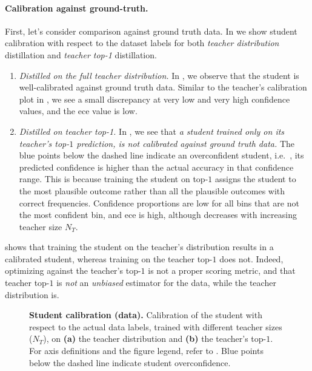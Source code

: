 \paragraph{Calibration against ground-truth.}
First, let's consider comparison against ground truth data.
In  we show  student calibration with respect to the dataset labels
for both \emph{teacher distribution} distillation and \emph{teacher top-1} distillation.
\begin{enumerate}
  \item \emph{Distilled on the full teacher distribution.} In , we observe that the student is well-calibrated against ground truth data. Similar to the teacher's calibration plot in , we see a small discrepancy at very low and very high confidence values, and the \gls{ece} value is low.
  \item \emph{Distilled on teacher top-1.} In , we see that \emph{a student trained only on its teacher's top-$1$ prediction, 
  is not calibrated against ground truth data.} 
  The blue points below the dashed line indicate an overconfident student, i.e.~, its predicted confidence is higher than the actual accuracy in that confidence range. 
  This is because training the student on top-$1$ assigns the student to the most plausible outcome rather than all the plausible outcomes with correct frequencies. 
  Confidence proportions are low for all bins that are not the most confident bin, and \gls{ece} is high, although decreases with increasing teacher size $N_T$.
\end{enumerate}
 shows that training the student on the teacher's distribution results in a calibrated student, whereas training on the teacher top-$1$
does not.
Indeed, optimizing against the teacher's top-$1$ is not a proper scoring metric, and that teacher top-$1$ is \emph{not} an \emph{unbiased} estimator for the data, while the teacher distribution is.
\begin{figure}[h]
  \centering
  \hfill
  \caption{\textbf{Student calibration (data).} Calibration of the student with respect to the actual data labels, trained with different teacher sizes ($N_T$), on \textbf{(a)} the teacher distribution and \textbf{(b)} the teacher's top-$1$. For axis definitions and the figure legend, refer to . Blue points below the dashed line indicate student overconfidence.}
  \label{fig:calibration-student-data-20n}
\end{figure}

